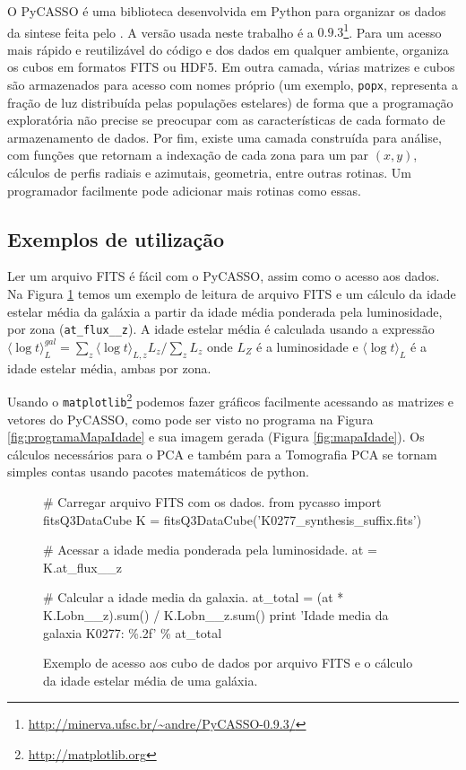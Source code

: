 O PyCASSO é uma biblioteca desenvolvida em Python para organizar os dados da
sintese feita pelo \starlight. A versão usada neste trabalho é a
$0.9.3$\footnote{\url{http://minerva.ufsc.br/~andre/PyCASSO-0.9.3/}}. Para um
acesso mais rápido e reutilizável do código e dos dados em qualquer ambiente,
organiza os cubos em formatos FITS ou HDF5. Em outra camada, várias matrizes e
cubos são armazenados para acesso com nomes próprio (um exemplo, \texttt{popx},
representa a fração de luz distribuída pelas populações estelares) de forma que
a programação exploratória não precise se preocupar com as características de
cada formato de armazenamento de dados. Por fim, existe uma camada construída
para análise, com funções que retornam a indexação de cada zona para um par $(x,
y)$, cálculos de perfis radiais e azimutais, geometria, entre outras rotinas. Um
programador facilmente pode adicionar mais rotinas como essas.

\subsection{Exemplos de utilização}

Ler um arquivo FITS é fácil com o PyCASSO, assim como o acesso aos dados. Na
Figura \ref{fig:dataAccess} temos um exemplo de leitura de arquivo FITS e um
cálculo da idade estelar média da galáxia a partir da idade média ponderada pela
luminosidade, por zona (\texttt{at\_flux\_\_z}). A idade estelar média é
calculada usando a expressão $ \langle \log t \rangle^{gal}_L = \sum_z \langle
\log t \rangle_{L,z} L_z /\sum_z L_z$ onde $L_Z $ é a luminosidade e $ \langle
\log t \rangle_L $ é a idade estelar média, ambas por zona.

Usando o \texttt{matplotlib}\footnote{\url{http://matplotlib.org}} podemos fazer
gráficos facilmente acessando as matrizes e vetores do PyCASSO, como pode ser
visto no programa na Figura \ref{fig:programaMapaIdade} e sua imagem gerada
(Figura \ref{fig:mapaIdade}). Os cálculos necessários para o PCA e também para a
Tomografia PCA se tornam simples contas usando pacotes matemáticos de python.

\begin{figure}
\begin{python}
# Carregar arquivo FITS com os dados.
from pycasso import fitsQ3DataCube
K = fitsQ3DataCube('K0277_synthesis_suffix.fits')

# Acessar a idade media ponderada pela luminosidade.
at = K.at_flux__z

# Calcular a idade media da galaxia.
at_total = (at * K.Lobn__z).sum() / K.Lobn__z.sum()
print 'Idade media da galaxia K0277: \%.2f' \% at_total
\end{python}
	\caption[Exemplo de programa utilizando PyCASSO]
	{Exemplo de acesso aos cubo de dados por arquivo FITS e o cálculo da idade
	estelar média de uma galáxia.}
	\label{fig:dataAccess}
\end{figure}

